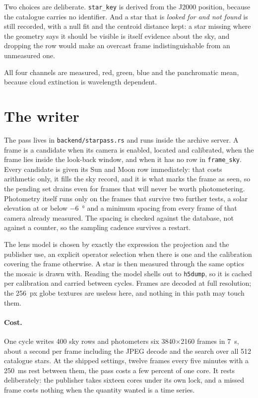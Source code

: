 \documentclass[11pt,a4paper]{article}
\begin{document}
Two choices are deliberate. \texttt{star\_key} is derived from the J2000
position, because the catalogue carries no identifier. And a star that is
\emph{looked for and not found} is still recorded, with a null fit and the
centroid distance kept: a star missing where the geometry says it should be
visible is itself evidence about the sky, and dropping the row would make an
overcast frame indistinguishable from an unmeasured one.

All four channels are measured, red, green, blue and the panchromatic mean,
because cloud extinction is wavelength dependent.

\section{The writer}
\label{sec:writer}

The pass lives in \texttt{backend/starpass.rs} and runs inside the archive
server. A frame is a candidate when its camera is enabled, located and
calibrated, when the frame lies inside the look-back window, and when it has no
row in \texttt{frame\_sky}. Every candidate is given its Sun and Moon row
immediately: that costs arithmetic only, it fills the sky record, and it is what
marks the frame as seen, so the pending set drains even for frames that will
never be worth photometering. Photometry itself runs only on the frames that
survive two further tests, a solar elevation at or below \SI{-6}{\degree} and a
minimum spacing from every frame of that camera already measured. The spacing is
checked against the database, not against a counter, so the sampling cadence
survives a restart.

The lens model is chosen by exactly the expression the projection and the
publisher use, an explicit operator selection when there is one and the
calibration covering the frame otherwise. A star is then measured through the
same optics the mosaic is drawn with. Reading the model shells out to
\texttt{h5dump}, so it is cached per calibration and carried between cycles.
Frames are decoded at full resolution; the \SI{256}{px} globe textures are
useless here, and nothing in this path may touch them.

\paragraph{Cost.} One cycle writes \num{400} sky rows and photometers six
\num{3840}$\times$\num{2160} frames in \SI{7}{\second}, about a second per frame
including the JPEG decode and the search over all \num{512} catalogue stars. At
the shipped settings, twelve frames every five minutes with a
\SI{250}{\milli\second} rest between them, the pass costs a few percent of one
core. It rests deliberately: the publisher takes sixteen cores under its own
lock, and a missed frame costs nothing when the quantity wanted is a time
series.
\end{document}
